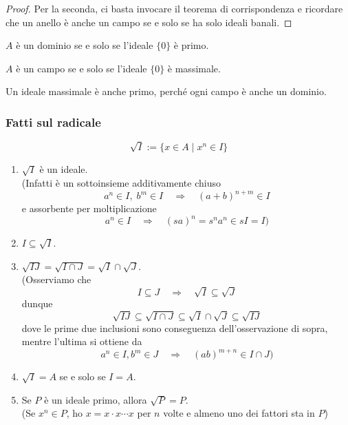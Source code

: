 \begin{multicols}{2}
\begin{proof}
	Per la seconda, ci basta invocare il teorema di corrispondenza e ricordare che un anello è anche un campo se e solo se ha solo ideali banali.
\end{proof}

\begin{remark}
	$ A $ è un dominio se e solo se l'ideale $ \{0\} $ è primo.
\end{remark}
\begin{remark}
	$ A $ è un campo se e solo se l'ideale $ \{0\} $ è massimale.
\end{remark}
\begin{remark}
	Un ideale massimale è anche primo, perché ogni campo è anche un dominio.
\end{remark}

\subsubsection{Fatti sul radicale}
\begin{definition}
	$$  \sqrt{I}:= \{ x \in A \mid x^n \in I \}  $$
\end{definition}

\begin{enumerate}
	\item $ \sqrt{I} $ è un ideale. \\ (Infatti è un sottoinsieme additivamente chiuso
	\[ a^n \in I,\;  b^m \in I \quad\Rightarrow\quad (a+b)^{n+m} \in I \]
	e assorbente per moltiplicazione
	\[ a^n \in I \quad\Rightarrow\quad (sa)^{n} = s^na^n \in sI = I ) \]
	
	\item $ I \subseteq \sqrt{I} $.
	\item $ \sqrt{IJ} = \sqrt{I \cap J} = \sqrt{I} \cap \sqrt{J} $. \\ (Osserviamo che
	\[ I \subseteq J \quad\Rightarrow\quad \sqrt{I} \subseteq \sqrt{J} \]
	dunque 
	\[ \sqrt{IJ} \subseteq \sqrt{I \cap J} \subseteq \sqrt{I} \cap \sqrt{J} \subseteq \sqrt{IJ} \]
	dove le prime due inclusioni sono conseguenza dell'osservazione di sopra, mentre l'ultima si ottiene da
	\[ a^n \in I, b^m \in J \quad\Rightarrow\quad (ab)^{m + n} \in I \cap J )\]
	
	\item $ \sqrt{I} = A $ se e solo se $ I = A $.
	\item Se $ P $ è un ideale primo, allora $ \sqrt{P} = P $. \\ 
	(Se $ x^n \in P $, ho $ x = x \cdot x \cdots x $ per $ n $ volte e almeno uno dei fattori sta in $ P $)
	

\end{enumerate}
\end{multicols}
